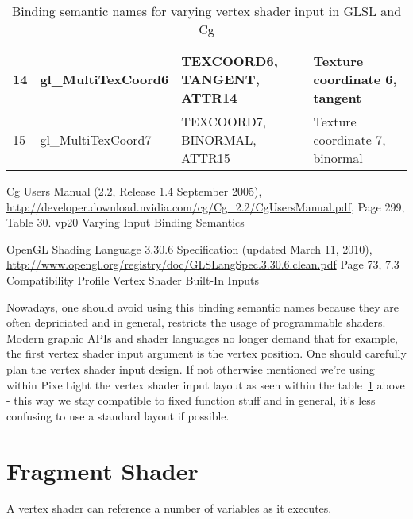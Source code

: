 \begin{table}[htb]
\begin{ThreePartTable}
\begin{tabular}{|l|l|p{}|l|}
				\hline
				14	&	gl\_MultiTexCoord6	&	TEXCOORD6, TANGENT, ATTR14	&	Texture coordinate 6, tangent\\
				\hline
				15	&	gl\_MultiTexCoord7	&	TEXCOORD7, BINORMAL, ATTR15	&	Texture coordinate 7, binormal\\
				\hline
			\bottomrule
		\end{tabular}
		\begin{tablenotes}
			\item[1] Cg Users Manual (2.2, Release 1.4 September 2005), \url{http://developer.download.nvidia.com/cg/Cg\_2.2/CgUsersManual.pdf}, Page 299, Table 30. vp20 Varying Input Binding Semantics
			\item[2] OpenGL Shading Language 3.30.6 Specification (updated March 11, 2010), \url{http://www.opengl.org/registry/doc/GLSLangSpec.3.30.6.clean.pdf} Page 73, 7.3 Compatibility Profile Vertex Shader Built-In Inputs
		\end{tablenotes}
		\caption{Binding semantic names for varying vertex shader input in \ac{GLSL} and Cg}
		\label{Table:VaryingVertexShaderInput}
	\end{ThreePartTable}
\end{table}
Nowadays, one should avoid using this binding semantic names because they are often depriciated and in general, restricts the usage of programmable shaders. Modern graphic \ac{API}s and shader languages no longer demand that for example, the first vertex shader input argument is the vertex position. One should carefully plan the vertex shader input design. If not otherwise mentioned we're using within PixelLight the vertex shader input layout as seen within the table~\ref{Table:VaryingVertexShaderInput} above - this way we stay compatible to fixed function stuff and in general, it's less confusing to use a standard layout if possible.




\section{Fragment Shader}
A vertex shader can reference a number of variables as it executes.
